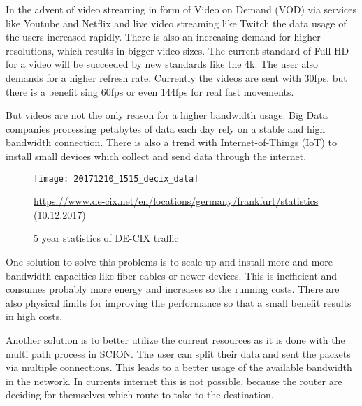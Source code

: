 \documentclass[thesis.tex]{subfiles}
\begin{document}
In the advent of video streaming in form of Video on Demand (VOD) via services like Youtube and Netflix and live video streaming like Twitch the data usage of the users increased rapidly. There is also an increasing demand for higher resolutions, which results in bigger video sizes. The current standard of Full HD for a video will be succeeded by new standards like the 4k. The user also demands for a higher refresh rate. Currently the videos are sent with 30fps, but there is a benefit sing 60fps or even 144fps for real fast movements.

But videos are not the only reason for a higher bandwidth usage. Big Data companies processing petabytes of data each day rely on a stable and high bandwidth connection. There is also a trend with Internet-of-Things (IoT) to install small devices which collect and send data through the internet.

\begin{figure}
    \centering
    \texttt{[image: 20171210\_1515\_decix\_data]}
    \caption*{\tiny{ \url{https://www.de-cix.net/en/locations/germany/frankfurt/statistics} (10.12.2017)}}
    \label{fig:intro:decixData}
    \caption{5 year statistics of DE-CIX traffic}
\end{figure}


One solution to solve this problems is to scale-up and install more and more bandwidth capacities like fiber cables or newer devices. This is inefficient and consumes probably more energy and increases so the running costs. There are also physical limits for improving the performance so that a small benefit results in high costs.

Another solution is to better utilize the current resources as it is done with the multi path process in SCION. The user can split their data and sent the packets via multiple connections. This leads to a better usage of the available bandwidth in the network. In currents internet this is not possible, because the router are deciding for themselves which route to take to the destination. 
\end{document}
